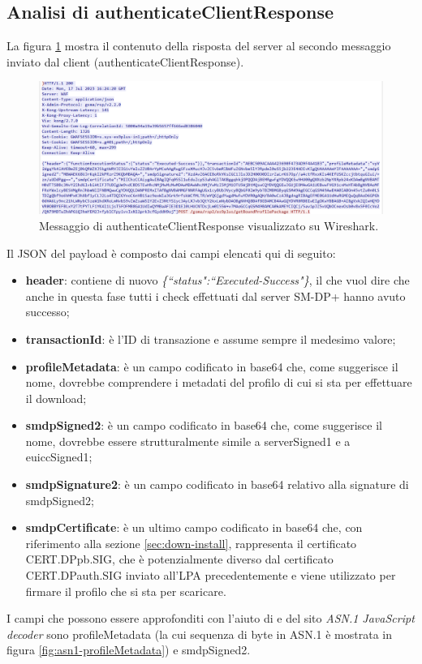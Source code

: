 \documentclass[10pt, oneside]{book}
\begin{document}
\subsection{Analisi di authenticateClientResponse}
La figura \ref{fig:msg4-stream-pcap} mostra il contenuto della risposta del server al secondo messaggio inviato dal client (authenticateClientResponse).\\
\begin{figure}
\includegraphics[width=\linewidth]{msg4-stream-pcap.png}
\caption{Messaggio di authenticateClientResponse visualizzato su Wireshark.}
\label{fig:msg4-stream-pcap}
\end{figure}
Il JSON del payload è composto dai campi elencati qui di seguito:
\begin{itemize}
\item \textbf{header}: contiene di nuovo \textit{\{``status":``Executed-Success"\}}, il che vuol dire che anche in questa fase tutti i check effettuati dal server SM-DP+ hanno avuto successo;
\item \textbf{transactionId}: è l'ID di transazione e assume sempre il medesimo valore;
\item \textbf{profileMetadata}: è un campo codificato in base64 che, come suggerisce il nome, dovrebbe comprendere i metadati del profilo di cui si sta per effettuare il download;
\item \textbf{smdpSigned2}: è un campo codificato in base64 che, come suggerisce il nome, dovrebbe essere strutturalmente simile a serverSigned1 e a euiccSigned1;
\item \textbf{smdpSignature2}: è un campo codificato in base64 relativo alla signature di smdpSigned2;
\item \textbf{smdpCertificate}: è un ultimo campo codificato in base64 che, con riferimento alla sezione \ref{sec:down-install}, rappresenta il certificato CERT.DPpb.SIG, che è potenzialmente diverso dal certificato CERT.DPauth.SIG inviato all'LPA precedentemente e viene utilizzato per firmare il profilo che si sta per scaricare.
\end{itemize}
I campi che possono essere approfonditi con l'aiuto di \cite{RSP-definitions} e del sito \textit{ASN.1 JavaScript decoder} sono profileMetadata (la cui sequenza di byte in ASN.1 è mostrata in figura \ref{fig:asn1-profileMetadata}) e smdpSigned2.\\
\end{document}
